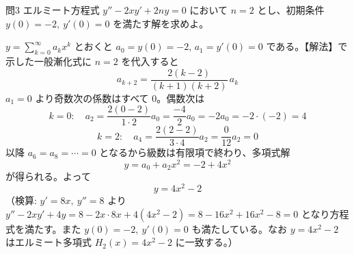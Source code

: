\documentclass[a4paper,11pt]{article}
\begin{document}
\clearpage
\begin{mondaiboxS}{問3}
エルミート方程式 $y'' - 2xy' + 2ny = 0$ において $n=2$ とし、初期条件 $y(0)=-2,\ y'(0)=0$ を満たす解を求めよ。
\end{mondaiboxS}
\kaitou
$y=\sum_{k=0}^{\infty}a_k x^k$ とおくと $a_0 = y(0) = -2$, $a_1 = y'(0) = 0$ である。【解法】で示した一般漸化式に $n=2$ を代入すると
\[
a_{k+2} = \frac{2(k-2)}{(k+1)(k+2)}\,a_k
\]
$a_1=0$ より奇数次の係数はすべて $0$。偶数次は
\[
k=0:\quad a_2 = \frac{2(0-2)}{1\cdot 2}a_0 = \frac{-4}{2}a_0 = -2a_0 = -2\cdot(-2) = 4
\]
\[
k=2:\quad a_4 = \frac{2(2-2)}{3\cdot 4}a_2 = \frac{0}{12}a_2 = 0
\]
以降 $a_6=a_8=\cdots=0$ となるから級数は有限項で終わり、多項式解
\[
y = a_0 + a_2 x^{2} = -2 + 4x^{2}
\]
が得られる。よって
\[
\boxed{\; y = 4x^{2} - 2 \;}
\]
（検算: $y'=8x,\ y''=8$ より $y''-2xy'+4y = 8 - 2x\cdot 8x + 4(4x^2-2) = 8-16x^2+16x^2-8 = 0$ となり方程式を満たす。また $y(0)=-2,\ y'(0)=0$ も満たしている。なお $y=4x^2-2$ はエルミート多項式 $H_2(x)=4x^2-2$ に一致する。）
\end{document}
